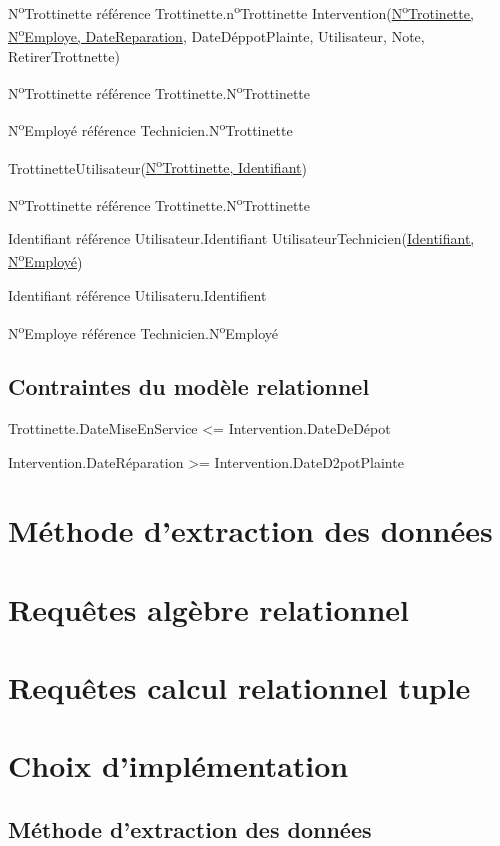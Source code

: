 \documentclass{article}
\newcommand\tab[1][1cm]{\hspace*{#1}}
\begin{document}
\tab N\textsuperscript{o}Trottinette référence Trottinette.n\textsuperscript{o}Trottinette
 \bigbreak
 Intervention(\underline{N\textsuperscript{o}Trotinette, N\textsuperscript{o}Employe, DateReparation}, DateDéppotPlainte, Utilisateur, Note, RetirerTrottnette)
 
 \tab N\textsuperscript{o}Trottinette référence Trottinette.N\textsuperscript{o}Trottinette
 
\tab N\textsuperscript{o}Employé référence Technicien.N\textsuperscript{o}Trottinette

\bigbreak
TrottinetteUtilisateur(\underline{N\textsuperscript{o}Trottinette, Identifiant})

\tab N\textsuperscript{o}Trottinette référence Trottinette.N\textsuperscript{o}Trottinette

\tab Identifiant référence Utilisateur.Identifiant
\bigbreak
UtilisateurTechnicien(\underline{Identifiant, N\textsuperscript{o}Employé})

\tab Identifiant référence Utilisateru.Identifient

\tab N\textsuperscript{o}Employe référence Technicien.N\textsuperscript{o}Employé

\subsection*{Contraintes du modèle relationnel}
Trottinette.DateMiseEnService <= Intervention.DateDeDépot

Intervention.DateRéparation >= Intervention.DateD2potPlainte

\section{Méthode d'extraction des données}

\section{Requêtes algèbre relationnel}

\section{Requêtes calcul relationnel tuple}

\section{Choix d'implémentation}
\subsection*{Méthode d'extraction des données}
\end{document}
